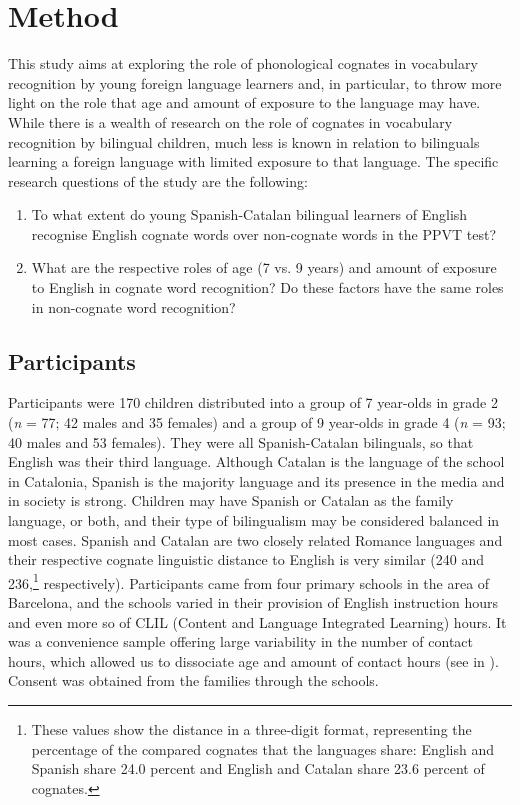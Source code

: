 \documentclass[output=paper,modfonts,nonflat,newtxmath]{langsci/langscibook}
\begin{document}
\section{Method}

{This study aims at exploring the role of phonological cognates in vocabulary recognition by young foreign language learners and, in particular, to throw more light on the role that age and amount of exposure to the language may have. While there is a wealth of research on the role of cognates in vocabulary recognition by bilingual children, much less is known in relation to bilinguals learning a foreign language with limited exposure to that language. The specific research questions of the study are the following:}
\begin{enumerate}
\item To what extent do young Spanish-Catalan bilingual learners of English recognise English cognate words over non-cognate words in the PPVT test?

\item  What are the respective roles of age (7 vs. 9 years) and amount of exposure to English in cognate word recognition? Do these factors have the same roles in non-cognate word recognition?

\end{enumerate}


\subsection{Participants}

{Participants were 170 children distributed into a group of 7 year-olds in grade 2 (}{\textit{n}} {= 77; 42 males and 35 females) and a group of 9 year-olds in grade 4 (}{\textit{n}} {= 93; 40 males and 53 females). They were all Spanish-Catalan bilinguals, so that English was their third language. Although Catalan is the language of the school in Catalonia, Spanish is the majority language and its presence in the media and in society is strong. Children may have Spanish or Catalan as the family language, or both, and their type of bilingualism may be considered balanced in most cases. Spanish and Catalan are two closely related Romance languages and their respective cognate linguistic distance to English \citep{DyenEtAl1992} is very similar (240 and 236,}\footnote{ {These values show the distance in a three-digit format, representing the percentage of the compared cognates that the languages share: English and Spanish share 24.0 percent and English and Catalan share 23.6 percent of cognates.} } {respectively)}{.}{\textbf{ }}{Participants came from four primary schools in the area of Barcelona, and the schools varied in their provision of English instruction hours and even more so of CLIL (Content and Language Integrated Learning) hours. It was a convenience sample offering large variability in the number of contact hours, which allowed us to dissociate age and amount of contact hours (see  in ). Consent was obtained from the families through the schools.}
\end{document}

